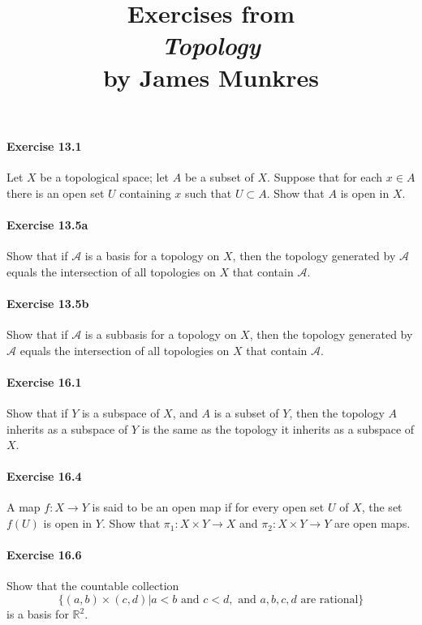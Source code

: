 \documentclass{article}
\title{\textbf{
Exercises from \\
\textit{Topology} \\
by James Munkres
}}
\date{}
\begin{document}
\maketitle

\paragraph{Exercise 13.1}
Let $X$ be a topological space; let $A$ be a subset of $X$. Suppose that for
each $x \in A$
there is an open set $U$ containing $x$ such that $U \subset A$. Show that $A$
is open in $X$.

\paragraph{Exercise 13.5a} Show that if $\mathcal{A}$ is a basis for a topology on $X$, then the topology generated by $\mathcal{A}$ equals the intersection of all topologies on $X$ that contain $\mathcal{A}$.

\paragraph{Exercise 13.5b} Show that if $\mathcal{A}$ is a subbasis for a topology on $X$, then the topology generated by $\mathcal{A}$ equals the intersection of all topologies on $X$ that contain $\mathcal{A}$.

\paragraph{Exercise 16.1} Show that if $Y$ is a subspace of $X$, and $A$ is a subset of $Y$, then the topology $A$ inherits as a subspace of $Y$ is the same as the topology it inherits as a subspace of $X$.

\paragraph{Exercise 16.4} A map $f: X \rightarrow Y$ is said to be an open map if for every open set $U$ of $X$, the set $f(U)$ is open in $Y$. Show that $\pi_{1}: X \times Y \rightarrow X$ and $\pi_{2}: X \times Y \rightarrow Y$ are open maps.

\paragraph{Exercise 16.6} Show that the countable collection \[\{(a, b) \times (c, d) | a < b \text{ and } c < d, \text{ and } a, b, c, d \text{ are rational}\}\] is a basis for $\mathbb{R}^2$.
\end{document}
